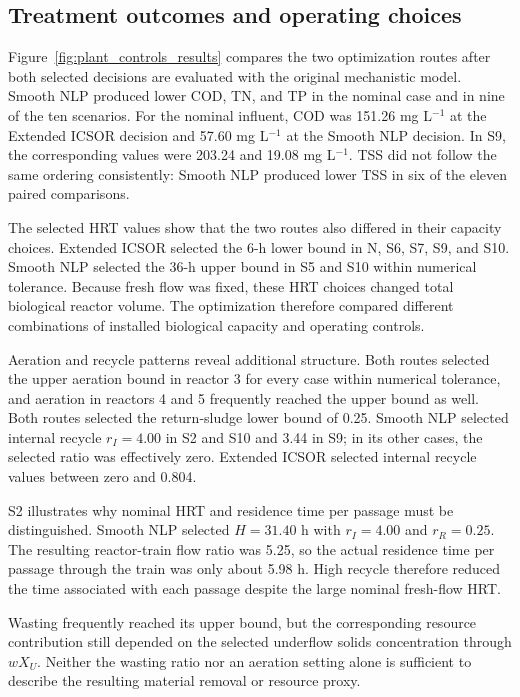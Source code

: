 \subsection{Treatment outcomes and operating choices}

Figure~\ref{fig:plant_controls_results} compares the two optimization routes after both selected decisions are evaluated with the original mechanistic model. Smooth NLP produced lower COD, TN, and TP in the nominal case and in nine of the ten scenarios. For the nominal influent, COD was 151.26 mg L$^{-1}$ at the Extended ICSOR decision and 57.60 mg L$^{-1}$ at the Smooth NLP decision. In S9, the corresponding values were 203.24 and 19.08 mg L$^{-1}$. TSS did not follow the same ordering consistently: Smooth NLP produced lower TSS in six of the eleven paired comparisons.

The selected HRT values show that the two routes also differed in their capacity choices. Extended ICSOR selected the 6-h lower bound in N, S6, S7, S9, and S10. Smooth NLP selected the 36-h upper bound in S5 and S10 within numerical tolerance. Because fresh flow was fixed, these HRT choices changed total biological reactor volume. The optimization therefore compared different combinations of installed biological capacity and operating controls.

Aeration and recycle patterns reveal additional structure. Both routes selected the upper aeration bound in reactor 3 for every case within numerical tolerance, and aeration in reactors 4 and 5 frequently reached the upper bound as well. Both routes selected the return-sludge lower bound of 0.25. Smooth NLP selected internal recycle $r_I=4.00$ in S2 and S10 and 3.44 in S9; in its other cases, the selected ratio was effectively zero. Extended ICSOR selected internal recycle values between zero and 0.804.

S2 illustrates why nominal HRT and residence time per passage must be distinguished. Smooth NLP selected $H=31.40$ h with $r_I=4.00$ and $r_R=0.25$. The resulting reactor-train flow ratio was 5.25, so the actual residence time per passage through the train was only about 5.98 h. High recycle therefore reduced the time associated with each passage despite the large nominal fresh-flow HRT.

Wasting frequently reached its upper bound, but the corresponding resource contribution still depended on the selected underflow solids concentration through $wX_U$. Neither the wasting ratio nor an aeration setting alone is sufficient to describe the resulting material removal or resource proxy.

